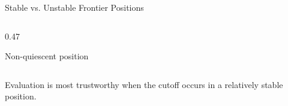 \documentclass[aspectratio=169,10pt]{beamer}
\begin{document}
\begin{frame}[shrink=18]{Stable vs. Unstable Frontier Positions}
\begin{columns}[T,onlytextwidth]
\begin{column}{0.47\textwidth}
\begin{block}{Non-quiescent position}
\begin{itemize}
        \end{itemize}

      \end{block}

    \end{column}

  \end{columns}

  \begin{keyidea}

    Evaluation is most trustworthy when the cutoff occurs in a relatively stable position.

  \end{keyidea}

\end{frame}



\end{document}
